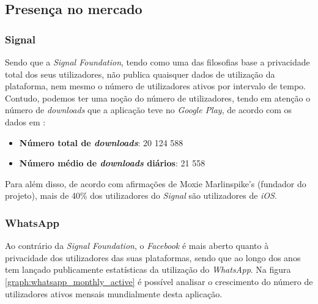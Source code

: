 \subsection{Presença no mercado}
\label{sec:market_presence}

\subsubsection{Signal}
Sendo que a \textit{Signal Foundation}, tendo como uma das filosofias base a privacidade total dos seus utilizadores, não publica quaisquer dados de utilização da plataforma, nem mesmo o número de utilizadores ativos por intervalo de tempo. Contudo, podemos ter uma noção do número de utilizadores, tendo em atenção o número de \textit{downloads} que a aplicação teve no \textit{Google Play}, de acordo com os dados em 
\cite{signal_android}:

\begin{itemize}
   \item \textbf{Número total de \textit{downloads}}: 20 124 588
   \item \textbf{Número médio de \textit{downloads} diários}: 21 558
\end{itemize}

Para além disso, de acordo com afirmações de Moxie Marlinspike's (fundador do projeto), mais de 40\% dos utilizadores do \textit{Signal} são utilizadores de \textit{iOS}. \cite{signal_ios}

\subsubsection{WhatsApp}
Ao contrário da \textit{Signal Foundation}, o \textit{Facebook} é mais aberto quanto à privacidade dos utilizadores das suas plataformas, sendo que ao longo dos anos tem lançado publicamente estatísticas da utilização do \textit{WhatsApp}. Na figura \ref{graph:whatsapp_monthly_active} é possível analisar o crescimento do número de utilizadores ativos mensais mundialmente desta aplicação.

